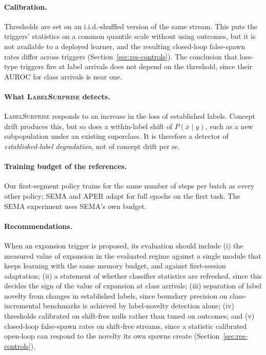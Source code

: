 \documentclass[10pt]{article}
\newcommand{\ls}{\textsc{LabelSurprise}}
\begin{document}
\paragraph{Calibration.} Thresholds are set on an i.i.d.-shuffled version of the same stream. This puts the triggers' statistics on a common quantile scale without using outcomes, but it is not available to a deployed learner, and the resulting closed-loop false-spawn rates differ across triggers (Section~\ref{sec:res-controls}). The conclusion that loss-type triggers fire at label arrivals does not depend on the threshold, since their AUROC for class arrivals is near one.

\paragraph{What \ls{} detects.} \ls{} responds to an increase in the loss of established labels. Concept drift produces this, but so does a within-label shift of $P(x\mid y)$, such as a new subpopulation under an existing superclass. It is therefore a detector of \emph{established-label degradation}, not of concept drift per se.

\paragraph{Training budget of the references.} Our first-segment policy trains for the same number of steps per batch as every other policy; SEMA and APER adapt for full epochs on the first task. The SEMA experiment uses SEMA's own budget.

\paragraph{Recommendations.} When an expansion trigger is proposed, its evaluation should include (i) the measured value of expansion in the evaluated regime against a single module that keeps learning with the same memory budget, and against first-session adaptation; (ii) a statement of whether classifier statistics are refreshed, since this decides the sign of the value of expansion at class arrivals; (iii) separation of label novelty from changes in established labels, since boundary precision on class-incremental benchmarks is achieved by label-novelty detection alone; (iv) thresholds calibrated on shift-free nulls rather than tuned on outcomes; and (v) closed-loop false-spawn rates on shift-free streams, since a statistic calibrated open-loop can respond to the novelty its own spawns create (Section~\ref{sec:res-controls}).
\end{document}
